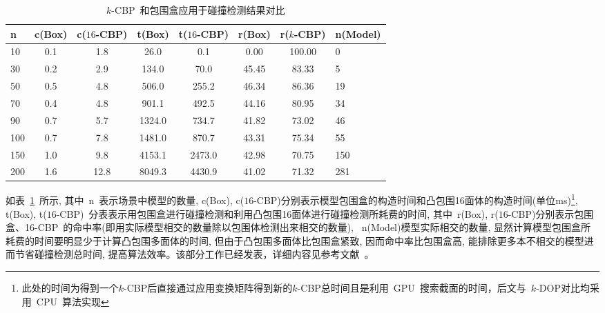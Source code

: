 \begin{table}[htbp]
\caption{$k$-CBP~和包围盒应用于碰撞检测结果对比}
\label{tab:exp:box:kcbp:collsiondetection}
\centering
\begin{tabular}{lccccccl}
 \toprule[1.5pt]
  n& c(Box) & c($16$-CBP) &  t(Box) & t($16$-CBP) & r(Box) & r($k$-CBP) & n(Model) \\
  \midrule[1.0pt]
   10 & 0.1 & 1.8 &    26.0  & 0.1    & 0.00  & 100.00 & 0\\
   30 & 0.2 & 2.9 &   134.0  & 70.0   & 45.45 & 83.33 & 5\\
   50 & 0.5 & 4.8 &   506.0  & 255.2  & 46.34 & 86.36 & 19 \\
   70 & 0.4 & 4.8 &   901.1  & 492.5  & 44.16 & 80.95 & 34 \\
   90 & 0.7 & 5.7 &  1324.0  & 734.7  & 41.82 & 73.02 & 46 \\
  100 & 0.7 & 7.8 &  1481.0  & 870.7  & 43.31 & 75.34 & 55 \\
  150 & 1.0 & 9.8 &  4153.1  & 2473.0 & 42.98 & 70.75 & 150 \\
  200 & 1.6 & 12.8 & 8049.3  & 4430.9 & 41.02 & 71.32 & 281 \\
  \bottomrule[1.5pt]
 \end{tabular}
\end{table}

如表~\ref{tab:exp:box:kcbp:collsiondetection}~所示,
其中~n~表示场景中模型的数量, c(Box), c($16$-CBP)分别表示模型包围盒的构造时间和凸包围16面体的构造时间(单位ms)\footnote{此处的时间为得到一个$k$-CBP后直接通过应用变换矩阵得到新的$k$-CBP总时间且是利用~GPU~搜索截面的时间，后文与~$k$-DOP对比均采用~CPU~算法实现}, t(Box), t($16$-CBP)~分表表示用包围盒进行碰撞检测和利用凸包围16面体进行碰撞检测所耗费的时间,
其中~r(Box), r($16$-CBP)分别表示包围盒、16-CBP~的命中率(即用实际模型相交的数量除以包围体检测出来相交的数量), ~n(Model)模型实际相交的数量, 显然计算模型包围盒所耗费的时间要明显少于计算凸包围多面体的时间, 但由于凸包围多面体比包围盒紧致,
因而命中率比包围盒高, 能排除更多本不相交的模型进而节省碰撞检测总时间, 提高算法效率。该部分工作已经发表，详细内容见参考文献~。

